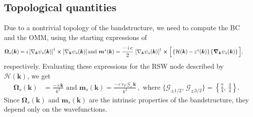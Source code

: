\documentclass[aps,prb,onecolumn,nofootinbib,citeautoscript,10pt, showkeys]{revtex4-2}
\begin{document}
\subsection{Topological quantities}

Due to a nontrivial topology of the bandstructure, we need to compute the BC and the OMM, using the starting expressions of \cite{xiao_review,xiao07_valley}
\begin{align} 
\label{eqomm}
& {\boldsymbol \Omega}_s ( \boldsymbol k)  = 
    i  \left[ \nabla_{ \boldsymbol k}  \psi_{s}({ \boldsymbol k}) \right ]^\dagger 
    \cross  \left [ \nabla_{ \boldsymbol k}  \psi_{s}({ \boldsymbol k}) \right ]
\text{and } 
{\boldsymbol {m}}^s ( \boldsymbol k) = 
\frac{  -\,i \, e} {2 } \,
 \left[ \nabla_{ \boldsymbol k} \psi_{s} ({ \boldsymbol k}) \right ]^\dagger 
 \cross
\Big [
\left \lbrace \mathcal{H} ({ \boldsymbol k}) -\varepsilon^s
({ \boldsymbol k}) 
\right \rbrace
\left \lbrace \boldsymbol \nabla_{ \boldsymbol k} \psi_{s}({ \boldsymbol k})
 \right \rbrace \Big  ] ,
\end{align}
respectively. Evaluating these expressions for the RSW node described by $\mathcal{H}(\boldsymbol{k}) $, we get \cite{graf_thesis, ips-rsw-ph}
\begin{align}  
{\boldsymbol \Omega}_s ( \boldsymbol k) &=    
	 \frac{  - \,s \,\boldsymbol k  } {k^3}  \text{ and } 
\boldsymbol{m}_s( \boldsymbol k) 
= \frac{  - \,e \,  v_F \, \mathcal{G}_s  \,\boldsymbol k } {k^2} \, ,
\text{ where } \lbrace \mathcal{G}_{\pm 1/2}, \,\mathcal{G}_{\pm 3/2} \rbrace
 = \left \lbrace \frac{7}{4}, \, \frac{3}{4} \right \rbrace.
\end{align}
Since $\boldsymbol  \Omega_s ( \boldsymbol k)$ and $\boldsymbol{m}_s( \boldsymbol k)$ are the intrinsic properties of the bandstructure, they depend only on the wavefunctions. 
\end{document}

